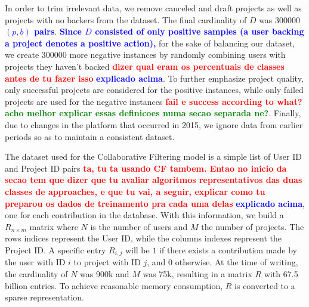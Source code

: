 \documentclass[cic,tc,english]{iiufrgs}
\newcommand{\bruno}[1]{\textcolor{red}{\textbf{#1}}}
\newcommand{\adriano}[1]{\textcolor{blue}{\textbf{#1}}}
\newcommand{\pergunta}[1]{\textcolor{green}{\textbf{#1}}}
\begin{document}
In order to trim irrelevant data, we remove canceled and draft projects as well as projects with no backers from the dataset. The final cardinality of \(D\) was 300000 \adriano{$(p,b)$ pairs}. \adriano{Since $D$ consisted of only positive samples (a user backing a project denotes a positive action),} for the sake of balancing our dataset, we create 300000 more negative instances by randomly combining users with projects they haven't backed \bruno{dizer qual eram os percentuais de classes antes de tu fazer isso} \adriano{explicado acima}. To further emphasize project quality, only successful projects are considered for the positive instances, while only failed projects are used for the negative instances \bruno{fail e success according to what?} \pergunta{acho melhor explicar essas definicoes numa secao separada ne?}. Finally, due to changes in the platform that occurred in 2015, we ignore data from earlier periods so as to maintain a consistent dataset.

The dataset used for the Collaborative Filtering model is a simple list of User ID and Project ID pairs \bruno{ta, tu ta usando CF tambem. Entao no inicio da secao tem que dizer que tu avaliar algoritmos representativos das duas classes de approaches, e que tu vai, a seguir, explicar como tu preparou os dados de treinamento pra cada uma delas} \adriano{explicado acima}, one for each contribution in the database. With this information, we build a \(R_{n\times m}\) matrix where $N$ is the number of users and $M$ the number of projects. The rows indices represent the User ID, while the columns indexes represent the Project ID. A specific entry $R_{i,j}$ will be $1$ if there exists a contribution made by the user with ID $i$ to project with ID $j$, and $0$ otherwise. At the time of writing, the cardinality of $N$ was 900k and $M$ was 75k, resulting in a matrix $R$ with 67.5 billion entries. To achieve reasonable memory consumption, $R$ is converted to a sparse representation.
\end{document}
